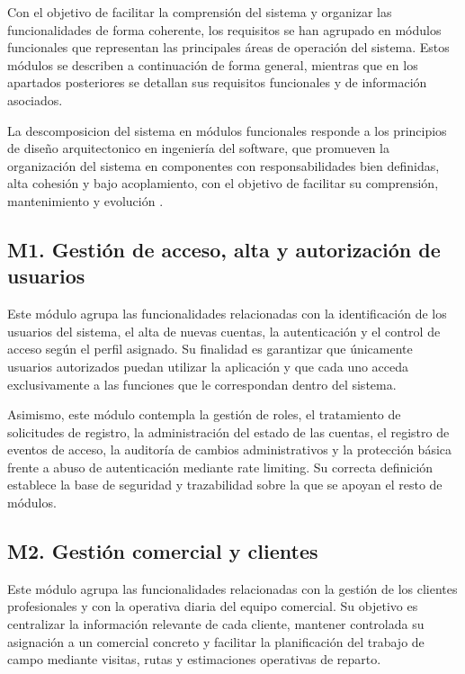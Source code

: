 Con el objetivo de facilitar la comprensión del sistema y organizar las funcionalidades de forma coherente, los requisitos se han agrupado en módulos funcionales que representan las principales áreas de operación del sistema. Estos módulos se describen a continuación de forma general, mientras que en los apartados posteriores se detallan sus requisitos funcionales y de información asociados.

La descomposicion del sistema en módulos funcionales responde a los principios de diseño arquitectonico en ingeniería del software, que promueven la organización del sistema en componentes con responsabilidades bien definidas, alta cohesión y bajo acoplamiento, con el objetivo de facilitar su comprensión, mantenimiento y evolución \citep[Ch.~6--7]{sommerville}.

\subsection{M1. Gestión de acceso, alta y autorización de usuarios}

Este módulo agrupa las funcionalidades relacionadas con la identificación de los usuarios del sistema, el alta de nuevas cuentas, la autenticación y el control de acceso según el perfil asignado. Su finalidad es garantizar que únicamente usuarios autorizados puedan utilizar la aplicación y que cada uno acceda exclusivamente a las funciones que le correspondan dentro del sistema.

Asimismo, este módulo contempla la gestión de roles, el tratamiento de solicitudes de registro, la administración del estado de las cuentas, el registro de eventos de acceso, la auditoría de cambios administrativos y la protección básica frente a abuso de autenticación mediante rate limiting. Su correcta definición establece la base de seguridad y trazabilidad sobre la que se apoyan el resto de módulos.

\subsection{M2. Gestión comercial y clientes}

Este módulo agrupa las funcionalidades relacionadas con la gestión de los clientes profesionales y con la operativa diaria del equipo comercial. Su objetivo es centralizar la información relevante de cada cliente, mantener controlada su asignación a un comercial concreto y facilitar la planificación del trabajo de campo mediante visitas, rutas y estimaciones operativas de reparto.

